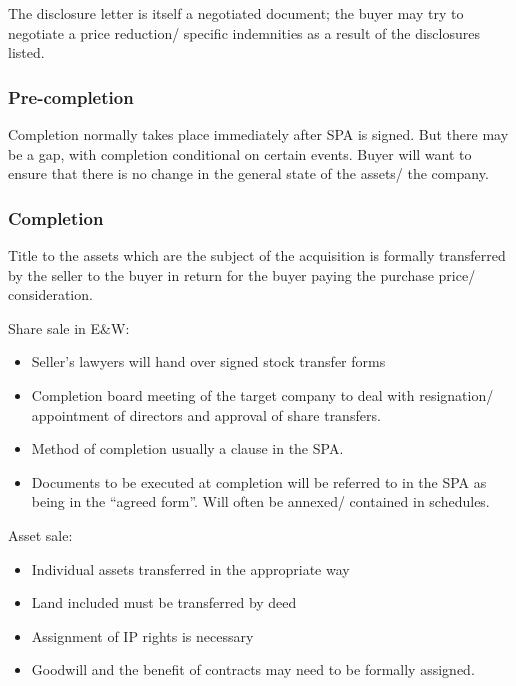\documentclass[
]{article}
\providecommand{\tightlist}{%
  \setlength{\itemsep}{0pt}\setlength{\parskip}{0pt}}
\begin{document}
The disclosure letter is itself a negotiated document; the buyer may try
to negotiate a price reduction/ specific indemnities as a result of the
disclosures listed.

\hypertarget{pre-completion}{%
\subsubsection{Pre-completion}\label{pre-completion}}

Completion normally takes place immediately after SPA is signed. But
there may be a gap, with completion conditional on certain events. Buyer
will want to ensure that there is no change in the general state of the
assets/ the company.

\hypertarget{completion}{%
\subsubsection{Completion}\label{completion}}

Title to the assets which are the subject of the acquisition is formally
transferred by the seller to the buyer in return for the buyer paying
the purchase price/ consideration.

Share sale in E\&W:

\begin{itemize}
\tightlist
\item
  Seller's lawyers will hand over signed stock transfer forms
\item
  Completion board meeting of the target company to deal with
  resignation/ appointment of directors and approval of share transfers.
\item
  Method of completion usually a clause in the SPA.
\item
  Documents to be executed at completion will be referred to in the SPA
  as being in the ``agreed form''. Will often be annexed/ contained in
  schedules.
\end{itemize}

Asset sale:

\begin{itemize}
\tightlist
\item
  Individual assets transferred in the appropriate way
\item
  Land included must be transferred by deed
\item
  Assignment of IP rights is necessary
\item
  Goodwill and the benefit of contracts may need to be formally
  assigned.
\end{itemize}
\end{document}
